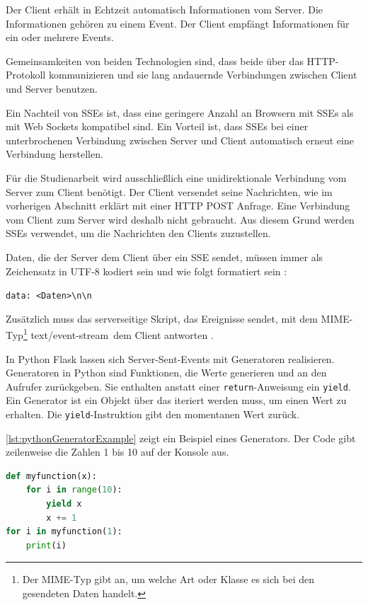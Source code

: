 \documentclass[a4paper,titlepage,halfparskip,12pt]{scrreprt}
\newcommand*{\escape}[1]{\texttt{\textbackslash#1}}
\begin{document}
\begin{onehalfspacing}
Der Client erhält in Echtzeit automatisch Informationen vom Server. Die Informationen gehören zu einem Event. Der Client empfängt Informationen für ein oder mehrere Events.\cite{sseMorzilla, sseVSwebsockets}

Gemeinsamkeiten von beiden Technologien sind, dass beide über das \acs{HTTP}-Protokoll kommunizieren und sie lang andauernde Verbindungen zwischen Client und Server benutzen.

Ein Nachteil von \acs{SSE}s ist, dass eine geringere Anzahl an Browsern mit \acs{SSE}s als mit Web Sockets kompatibel sind. Ein Vorteil ist, dass \acs{SSE}s bei einer unterbrochenen Verbindung zwischen Server und Client automatisch erneut eine Verbindung herstellen.\cite{sseMorzilla}

Für die Studienarbeit wird ausschließlich eine unidirektionale Verbindung vom Server zum Client benötigt. Der Client versendet seine Nachrichten, wie im vorherigen Abschnitt erklärt mit einer \acs{HTTP} POST Anfrage. Eine Verbindung vom Client zum Server wird deshalb nicht gebraucht. Aus diesem Grund werden \acs{SSE}s verwendet, um die Nachrichten den Clients zuzustellen.

Daten, die der Server dem Client über ein \acs{SSE} sendet, müssen immer als Zeichensatz in UTF-8 kodiert sein und wie folgt formatiert sein \cite{sseMorzilla}:

\texttt{data: <Daten>\escape{n}\escape{n}}

Zusätzlich muss das serverseitige Skript, das Ereignisse sendet, mit dem \acs{MIME}-Typ\footnote{ Der MIME-Typ gibt an, um welche Art oder Klasse es sich bei den gesendeten Daten handelt.\cite{mimeTypDescription}} \glqq text/event-stream\grqq\ dem Client antworten \cite{sseMorzilla}.

In Python Flask lassen sich Server-Sent-Events mit Generatoren realisieren. Generatoren in Python sind Funktionen, die Werte generieren und an den Aufrufer zurückgeben. Sie enthalten anstatt einer \texttt{return}-Anweisung ein \texttt{yield}. Ein Generator ist ein Objekt über das iteriert werden muss, um einen Wert zu erhalten. Die \texttt{yield}-Instruktion gibt den momentanen Wert zurück.

\autoref{lst:pythonGeneratorExample} zeigt ein Beispiel eines Generators. Der Code gibt zeilenweise die Zahlen 1 bis 10 auf der Konsole aus.

\begin{lstlisting}[language=python, caption={Beispiel: Code für ein Generator Objekt in Python}, label={lst:pythonGeneratorExample}]
def myfunction(x):
    for i in range(10):
        yield x
        x += 1
for i in myfunction(1):
    print(i)
\end{lstlisting}


\end{onehalfspacing}
\end{document}
